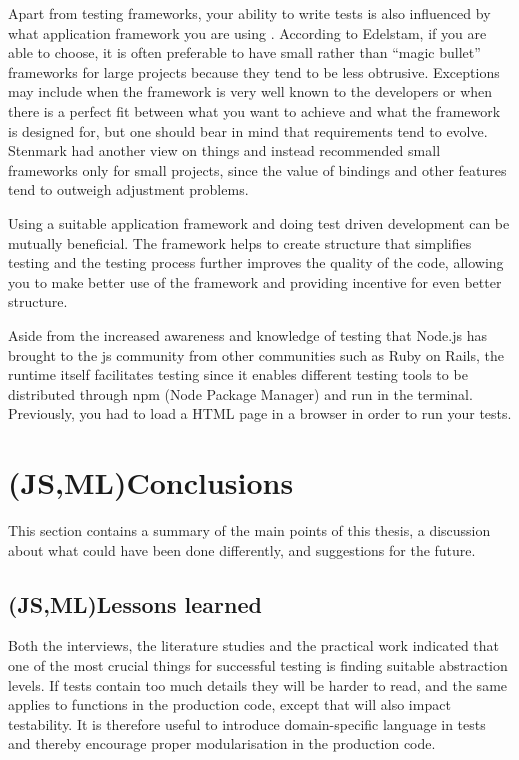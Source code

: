 \documentclass[11pt]{article}
\begin{document}
Apart from testing frameworks, your ability to write tests is also influenced by what application framework you are using \cite[question~8]{Ahnve}. According to Edelstam, if you are able to choose, it is often preferable to have small rather than ``magic bullet'' frameworks for large projects because they tend to be less obtrusive. Exceptions may include when the framework is very well known to the developers or when there is a perfect fit between what you want to achieve and what the framework is designed for, but one should bear in mind that requirements tend to evolve. \cite[questions~48-50]{Edelstam} Stenmark had another view on things and instead recommended small frameworks only for small projects, since the value of bindings and other features tend to outweigh adjustment problems. \cite[questions~12-14]{Stenmark}

Using a suitable application framework and doing test driven development can be mutually beneficial. The framework helps to create structure that simplifies testing and the testing process further improves the quality of the code, allowing you to make better use of the framework and providing incentive for even better structure. \cite[question~15]{Stenmark}

Aside from the increased awareness and knowledge of testing that Node.js has brought to the \gls{js} community from other communities such as Ruby on Rails, the runtime itself facilitates testing since it enables different testing tools to be distributed through npm (Node Package Manager) and run in the terminal. Previously, you had to load a HTML page in a browser in order to run your tests. \cite[question~9]{Stenmark}


\section{(JS,ML)Conclusions}
\label{sec:conclusions}

This section contains a summary of the main points of this thesis, a discussion about what could have been done differently, and suggestions for the future.

\subsection{(JS,ML)Lessons learned}

Both the interviews, the literature studies and the practical work indicated that one of the most crucial things for successful testing is finding suitable abstraction levels. If tests contain too much details they will be harder to read, and the same applies to functions in the production code, except that will also impact testability. It is therefore useful to introduce domain-specific language in tests \cite[p.~127]{Clean} and thereby encourage proper modularisation in the production code.
\end{document}
